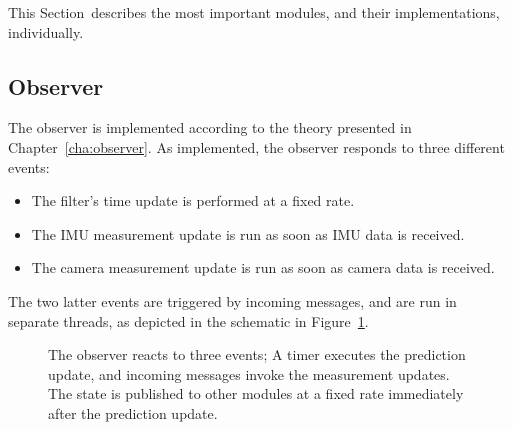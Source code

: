         This Section~describes the most important modules, and their implementations, individually.
        \subsection{Observer}
            The observer is implemented according to the theory presented in Chapter~\ref{cha:observer}.
            As implemented, the observer responds to three different events:
            \begin{itemize}
                \item The filter's time update is performed at a fixed rate.
                \item The IMU measurement update is run as soon as IMU data is received.
                \item The camera measurement update is run as soon as camera data is received.
            \end{itemize}
            The two latter events are triggered by incoming messages, and are run in
            separate threads, as depicted in the schematic in Figure~\ref{fig:crap:observer}.

            \begin{figure}[H]
                \noindent{}
                \caption{The observer reacts to three events; A timer executes the prediction update, and incoming messages invoke the measurement updates. The state is published to other modules at a fixed rate immediately after the prediction update.}
                \label{fig:crap:observer}
            \end{figure}
